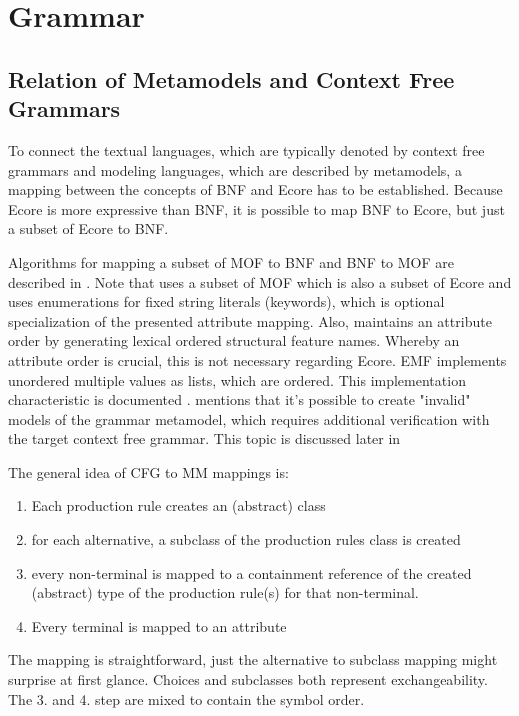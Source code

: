 \chapter{Grammar}
\label{cha:grammar}


\section{Relation of Metamodels and Context Free Grammars}
To connect the textual languages, which are typically denoted by context free grammars and modeling languages, which are described by metamodels, a mapping between the concepts of BNF and Ecore has to be established. Because Ecore is more expressive than BNF, it is possible to map BNF to Ecore, but just a subset of Ecore to BNF.

Algorithms for mapping a subset of MOF to BNF and BNF to MOF are described in \cite{MofCfg}. Note that \cite{MofCfg} uses a subset of MOF which is also a subset of Ecore and uses enumerations for fixed string literals (keywords), which is optional specialization of the presented attribute mapping. Also,  \cite{MofCfg} maintains an attribute order by generating lexical ordered structural feature names. Whereby an attribute order is crucial, this is not necessary regarding Ecore. EMF implements unordered multiple values as lists, which are ordered. This implementation characteristic is documented \cite{EMF2nd}.  \cite{MofCfg} mentions that it's possible to create "invalid" models of the grammar metamodel, which requires additional verification with the target context free grammar. This topic is discussed later in 

The general idea of CFG to MM mappings is:
\begin{enumerate}
	\item Each production rule creates an (abstract) class
	\item for each alternative,  a subclass of the production rules class is created
	\item every non-terminal is mapped to a containment reference of the created (abstract) type of the production rule(s) for that non-terminal.
	\item Every terminal is mapped to an attribute
\end{enumerate}

The mapping is straightforward, just the alternative to subclass mapping might surprise at first glance. Choices and subclasses both represent exchangeability. The 3. and 4. step are mixed to contain the symbol order.

